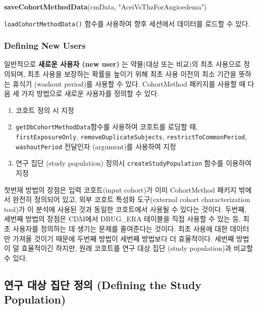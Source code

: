 \documentclass[11pt]{book}
\newenvironment{Shaded}{\begin{snugshade}}{\end{snugshade}}
\newcommand{\KeywordTok}[1]{\textcolor[rgb]{0.13,0.29,0.53}{\textbf{#1}}}
\newcommand{\StringTok}[1]{\textcolor[rgb]{0.31,0.60,0.02}{#1}}
\newcommand{\NormalTok}[1]{#1}
\providecommand{\tightlist}{%
  \setlength{\itemsep}{0pt}\setlength{\parskip}{0pt}}
\theoremstyle{definition}
\theoremstyle{definition}
\theoremstyle{definition}
\theoremstyle{remark}
\begin{document}
\begin{Shaded}
\begin{Highlighting}[]
\KeywordTok{saveCohortMethodData}\NormalTok{(cmData, }\StringTok{"AceiVsThzForAngioedema"}\NormalTok{)}
\end{Highlighting}
\end{Shaded}

\texttt{loadCohortMethodData()} 함수를 사용하여 향후 세션에서 데이터를
로드할 수 있다.

\subsubsection*{Defining New Users}\label{defining-new-users}

일반적으로 \textbf{새로운 사용자 (new user)} 는 약물(대상 또는 비교)의
최초 사용으로 정의되며, 최초 사용을 보장하는 확률을 높이기 위해 최초
사용 이전의 최소 기간을 뜻하는 휴식기 (washout period)를 사용할 수 있다.
CohortMethod 패키지를 사용할 때 다음 세 가지 방법으로 새로운 사용자를
정의할 수 있다.

\begin{enumerate}
\def\labelenumi{\arabic{enumi}.}
\tightlist
\item
  코호트 정의 시 지정
\item
  \texttt{getDbCohortMethodData}함수를 사용하여 코호트를 로딩할 때,
  \texttt{firstExposureOnly}, \texttt{removeDuplicateSubjects},
  \texttt{restrictToCommonPeriod}, \texttt{washoutPeriod} 전달인자
  (argument)를 사용하여 지정
\item
  연구 집단 (study population) 정의시 \texttt{createStudyPopulation}
  함수를 이용하여 지정
\end{enumerate}

첫번재 방법의 장점은 입력 코호트(input cohort)가 이미 CohortMethod
패키지 밖에서 완전히 정의되어 있고, 외부 코호트 특성화 도구(external
cohort characterization tool)가 이 분석에 사용된 것과 동일한 코호트에서
사용될 수 있다는 것이다. 두번째, 세번째 방법의 장점은 CDM에서 DRUG\_ERA
테이블을 직접 사용할 수 있는 등, 최초 사용자를 정의하는 데 생기는 문제를
줄여준다는 것이다. 최초 사용에 대한 데이터만 가져올 것이기 때문에 두번째
방법이 세번째 방법보다 더 효율적이다. 세번째 방법이 덜 효율적이긴
하지만, 원래 코호트를 연구 대상 집단 (study population)과 비교할 수
있다.

\subsection{연구 대상 집단 정의 (Defining the Study
Population)}\label{----defining-the-study-population}
\end{document}
